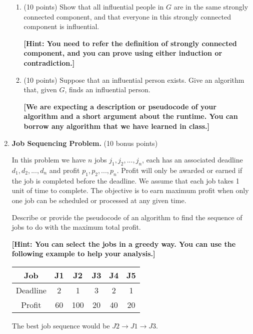 \documentclass[12pt]{article}
\begin{document}
\begin{enumerate}
  \begin{enumerate}
    \item (10 points) Show that all influential people in $G$ are in the same strongly connected component, and that everyone in this strongly connected component is influential.
      
    \textbf{[Hint: You need to refer the definition of strongly connected component, and you can prove using either induction or contradiction.]}

    \item (10 points) Suppose that an influential person exists. Give an algorithm that, given $G$, finds an influential person.
    
    \textbf{[We are expecting a description or pseudocode of your algorithm and a short argument about the runtime. You can borrow any algorithm that we have learned in class.]}
     
  \end{enumerate}


  \item \textbf{Job Sequencing Problem.} (10 bonus points)

In this problem we have $n$ jobs $j_1, j_2, ..., j_n$, each has an associated deadline $d_1, d_2, ..., d_n$ and profit $p_1, p_2, ..., p_n$. Profit will only be awarded or earned if the job is completed before the deadline. We assume that each job takes 1 unit of time to complete. The objective is to earn maximum profit when only one job can be scheduled or processed at any given time.

Describe or provide the pseudocode of an algorithm to find the sequence of jobs to do with the maximum total profit.

    \textbf{[Hint: You can select the jobs in a greedy way. You can use the following example to help your analysis.]}

\begin{table}[h]
\hspace{5cm}
\begin{tabular}
{|c|c|c|c|c|c|}\hline
Job & J1 & J2 & J3 & J4 & J5\\\hline
Deadline & 2 & 1 & 3 & 2 & 1\\\hline
Profit & 60 & 100 & 20 & 40 & 20\\\hline
\end{tabular}
\end{table}

The best job sequence would be $J2 \rightarrow J1 \rightarrow J3$.



\end{enumerate}
\end{document}
